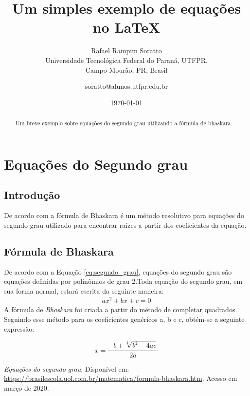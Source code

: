 \documentclass{article}
\title{Um simples exemplo de equações no \LaTeX}
\author{Rafael Rampim Soratto  \\
	Universidade Tecnológica Federal do Paraná, UTFPR,\\ Campo Mourão, PR, Brasil \\
	\and 
	\small{soratto@alunos.utfpr.edu.br}
}
\date{\today}
\begin{document}
	
	\maketitle
	\begin{abstract}
		Um breve exemplo sobre equações do segundo grau utilizando a fórmula de bhaskara.
	\end{abstract}
	
	\section{Equações do Segundo grau}
	
	\subsection{Introdução}
	 De acordo com \cite{uol} a fórmula de Bhaskara é um método resolutivo para equações do segundo grau utilizado para encontrar raízes a partir dos coeficientes da equação.	
	\subsection{Fórmula de Bhaskara}
	 De acordo com a Equação \ref{eq:segundo_grau}, equações do segundo grau são equações definidas por polinômios de grau 2.Toda equação do segundo grau, em sua forma normal, estará escrita da seguinte maneira:
	 \begin{eqnarray}
	  	ax^2+bx+c=0
	 	\label{eq:segundo_grau}
	 \end{eqnarray}
	A fórmula de \textit{Bhaskara} foi criada a partir do método de completar quadrados. Seguindo esse método para os coeficientes genéricos a, b e c, obtém-se a seguinte expressão: 
	
	$$x = \frac{-b\pm \sqrt[2]{b^2-4ac}}{2a}$$
		\label{eq:X}
	\begin{thebibliography}{9}
		 \emph{Equações do segundo grau}, Dísponível em:
		\url{https://brasilescola.uol.com.br/matematica/formula-bhaskara.htm}. Acesso em março de 2020.
	\end{thebibliography}
	
\end{document}
